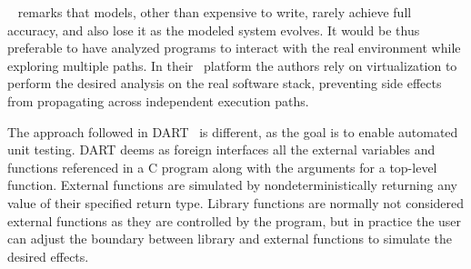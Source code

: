 {\sc \stwoe}~\cite{CKC-TOCS12} remarks that models, other than expensive to write, rarely achieve full accuracy, and also lose it as the modeled system evolves. It would be thus preferable to have analyzed programs to interact with the real environment while exploring multiple paths. In their \stwoe\ platform the authors rely on virtualization to perform the desired analysis on the real software stack, preventing side effects from propagating across independent execution paths. 

The approach followed in {\sc DART}~\cite{DART-PLDI05} is different, as the goal is to enable automated unit testing. DART deems as foreign interfaces all the external variables and functions referenced in a C program along with the arguments for a top-level function.
External functions are simulated by nondeterministically returning any value of their specified return type. Library functions are normally not considered external functions as they are controlled by the program, but in practice the user can adjust the boundary between library and external functions to simulate the desired effects.